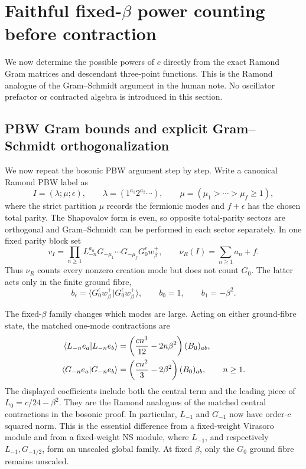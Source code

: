 \documentclass[11pt]{article}
\begin{document}
\section{Faithful fixed-\texorpdfstring{\(\beta\)}{beta} power counting
before contraction}
\label{sec:precontract-power-count}

We now determine the possible powers of \(c\) directly from the exact
Ramond Gram matrices and descendant three-point functions.  This is the
Ramond analogue of the Gram--Schmidt argument in the human note.  No
oscillator prefactor or contracted algebra is introduced in this section.

\subsection{PBW Gram bounds and explicit Gram--Schmidt orthogonalization}

We now repeat the bosonic PBW argument step by step.  Write a canonical
Ramond PBW label as
\begin{equation}
 I=(\lambda;\mu;\epsilon),
 \qquad
 \lambda=(1^{a_1}2^{a_2}\cdots),
 \qquad
 \mu=(\mu_1>\cdots>\mu_f\geq1),
 \label{eq:ramond-pbw-occupation-label}
\end{equation}
where the strict partition \(\mu\) records the fermionic modes and
\(f+\epsilon\) has the chosen total parity.  The Shapovalov form is even,
so opposite total-parity sectors are orthogonal and Gram--Schmidt can be
performed in each sector separately.  In one fixed parity block set
\begin{equation}
 v_I=
 \prod_{n\geq1}L_{-n}^{a_n}
 G_{-\mu_1}\cdots G_{-\mu_f}G_0^\epsilon w_\beta^+,
 \qquad
 \nu_R(I)=\sum_{n\geq1}a_n+f.
 \label{eq:ramond-pbw-mode-count}
\end{equation}
Thus \(\nu_R\) counts every nonzero creation mode but does not count
\(G_0\).  The latter acts only in the finite ground fibre,
\begin{equation}
 b_\epsilon
 =\langle G_0^\epsilon w_\beta^+|G_0^\epsilon w_\beta^+\rangle,
 \qquad
 b_0=1,
 \qquad
 b_1=-\beta^2.
 \label{eq:ramond-ground-fibre-diagonal}
\end{equation}

The fixed-\(\beta\) family changes which modes are large.  Acting on either
ground-fibre state, the matched one-mode contractions are
\begin{align}
 \langle L_{-n}e_a|L_{-n}e_b\rangle
 &=\left(\frac{cn^3}{12}-2n\beta^2\right)(B_0)_{ab},
 \notag\\
 \langle G_{-n}e_a|G_{-n}e_b\rangle
 &=\left(\frac{cn^2}{3}-2\beta^2\right)(B_0)_{ab},
 \qquad n\geq1.
 \label{eq:precontract-one-mode-norms}
\end{align}
The displayed coefficients include both the central term and the leading
piece of \(L_0=c/24-\beta^2\).  They are the Ramond analogues of the
matched central contractions in the bosonic proof.  In particular,
\(L_{-1}\) and \(G_{-1}\) now have order-\(c\) squared norm.  This is the
essential difference from a fixed-weight Virasoro module and from a
fixed-weight NS module, where \(L_{-1}\), and respectively
\(L_{-1},G_{-1/2}\), form an unscaled global family.  At fixed \(\beta\),
only the \(G_0\) ground fibre remains unscaled.
\end{document}
